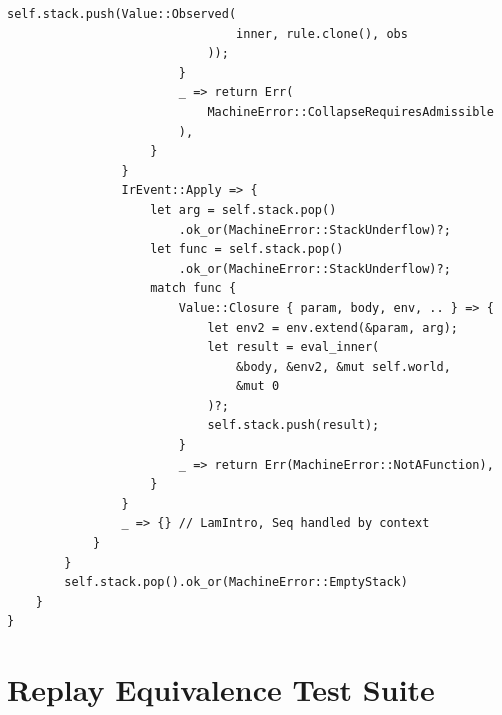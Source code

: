 \documentclass[12pt, a4paper, openany]{book}
\theoremstyle{plain}
\theoremstyle{definition}
\theoremstyle{remark}
\begin{document}
\begin{lstlisting}[style=rust, caption={The Spherepop VM}]
                            self.stack.push(Value::Observed(
                                inner, rule.clone(), obs
                            ));
                        }
                        _ => return Err(
                            MachineError::CollapseRequiresAdmissible
                        ),
                    }
                }
                IrEvent::Apply => {
                    let arg = self.stack.pop()
                        .ok_or(MachineError::StackUnderflow)?;
                    let func = self.stack.pop()
                        .ok_or(MachineError::StackUnderflow)?;
                    match func {
                        Value::Closure { param, body, env, .. } => {
                            let env2 = env.extend(&param, arg);
                            let result = eval_inner(
                                &body, &env2, &mut self.world,
                                &mut 0
                            )?;
                            self.stack.push(result);
                        }
                        _ => return Err(MachineError::NotAFunction),
                    }
                }
                _ => {} // LamIntro, Seq handled by context
            }
        }
        self.stack.pop().ok_or(MachineError::EmptyStack)
    }
}
\end{lstlisting}

\section{Replay Equivalence Test Suite}
\end{document}
